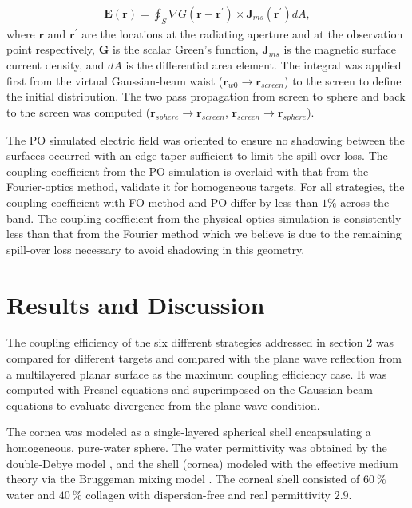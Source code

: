 \documentclass{osa-article}
\begin{document}
\begin{equation}\label{eq4-1}
\begin{aligned}
\mathbf{E}(\mathbf{r})= \oint_S \nabla G (\mathbf{r}-\mathbf{r^\prime}) \times \mathbf{J}_{ms}(\mathbf{r^\prime})dA,
\end{aligned}
\end{equation}
where $\mathbf{r}$ and $\mathbf{r^\prime}$ are the locations at the radiating aperture and at the observation point respectively, $\mathbf{G}$ is the scalar Green’s function, $\mathbf{J}_{ms}$ is the magnetic surface current density, and $dA$ is the differential area element. The integral was applied first from the virtual Gaussian-beam waist ($\mathbf{r}_{w0}\rightarrow\mathbf{r}_{screen}$) to the screen to define the initial distribution. The two pass propagation from screen to sphere and back to the screen was computed ($\mathbf{r}_{sphere}\rightarrow\mathbf{r}_{screen}$, $\mathbf{r}_{screen}\rightarrow\mathbf{r}_{sphere}$). 

The PO simulated electric field was oriented to ensure no shadowing between the surfaces occurred with an edge taper sufficient to limit the spill-over loss. The coupling coefficient from the PO simulation is overlaid with that from the Fourier-optics method, validate it for homogeneous targets. For all strategies, the coupling coefficient with FO method and PO differ by less than $1\%$ across the band. The coupling coefficient from the physical-optics simulation is consistently less than that from the Fourier method which we believe is due to the remaining spill-over loss necessary to avoid shadowing in this geometry. 


\section{Results and Discussion}

 The coupling efficiency of the six different strategies addressed in section 2 was compared for different targets and compared with the plane wave reflection from a multilayered planar surface as the maximum coupling efficiency case. It was computed with Fresnel equations and superimposed on the Gaussian-beam equations to evaluate divergence from the plane-wave condition.

The cornea was modeled as a single-layered spherical shell encapsulating a homogeneous, pure-water sphere. The water permittivity was obtained by the double-Debye model \cite{double}, and the shell (cornea) modeled with the effective medium theory via the Bruggeman mixing model \cite{ari}. The corneal shell consisted of $60\ \%$ water and $40\ \%$ collagen with dispersion-free and real permittivity $2.9$. 
\end{document}
